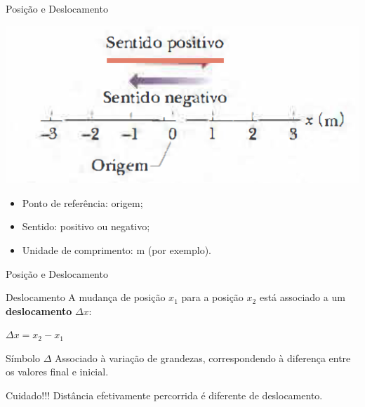 \documentclass[xcolor=dvipsnames,table]{beamer}
\begin{document}
	\begin{frame}{Posição e Deslocamento}
		\begin{center}
			\includegraphics[scale=0.6]{images/fig2-1}
		\end{center}
		\begin{itemize}
			\item Ponto de referência: origem; \pause
			\item Sentido: positivo ou negativo; \pause
			\item Unidade de comprimento: m (por exemplo).
		\end{itemize}
	\end{frame}

	\begin{frame}{Posição e Deslocamento}
		\begin{block}{Deslocamento}
			A mudança de posição $x_1$ para a posição $x_2$ está associado a um {\bf deslocamento} $\Delta x$: \pause
			\begin{center}
				$\Delta x = x_2 - x_1$
			\end{center}
		\end{block} \pause
		\begin{block}{Símbolo $\Delta$}
			Associado à variação de grandezas, correspondendo à diferença entre os valores final e inicial.
		\end{block} \pause
		\begin{alertblock}{Cuidado!!!}
			Distância efetivamente percorrida é diferente de deslocamento.
		\end{alertblock}
	\end{frame}
\end{document}
